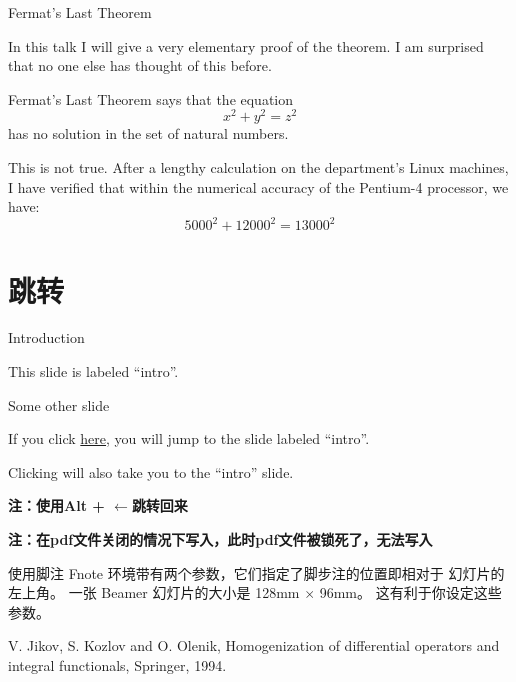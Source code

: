 \documentclass[10pt]{beamer}
\begin{document}
\begin{frame}{Fermat's Last Theorem} 
 
  In this talk I will give a very elementary proof of the 
  theorem.  I am surprised that no one else has thought of 
  this before. 
  \medskip 
   
  \pause 
   
  Fermat's Last Theorem says that the equation 
  \[ 
    x^2 + y^2 = z^2 
  \] 
  has no solution in the set of natural numbers. 
  \medskip 
   
  \pause 
   
  This is not true.  After a lengthy calculation on the 
  department's Linux machines, I have verified that within 
  the numerical accuracy of the Pentium-4 processor, we have: 
  \[ 
    5000^2 + 12000^2 = 13000^2 
  \] 
   
  \end{frame} 
\section{跳转}
\begin{frame}[label=intro]{Introduction}

  This slide is labeled ``intro''.
  
  \end{frame}
  
  \begin{frame}{Some other slide}
  
  If you click \hyperlink{intro}{here}, you will jump to the slide
  labeled ``intro''.
  
  \bigskip
  
  Clicking \hyperlink{intro}{} will also
  take you to the ``intro'' slide.

  \medskip

  \textbf{注：使用Alt + $\leftarrow$跳转回来}

  \bigskip

  \textbf{注：在pdf文件关闭的情况下写入，此时pdf文件被锁死了，无法写入}
  \end{frame}
  

\begin{frame}{使用脚注}
  Fnote 环境带有两个参数，它们指定了脚步注的位置即相对于
  幻灯片的左上角。 一张 Beamer 幻灯片的大小是 128mm $\times$ 96mm。
  这有利于你设定这些参数。


 \begin{Fnote}{4mm}{80mm}
      V. Jikov, S. Kozlov and O. Olenik, Homogenization
      of differential operators and integral
      functionals, Springer, 1994.
  \end{Fnote} 
\end{frame}
\end{document}
